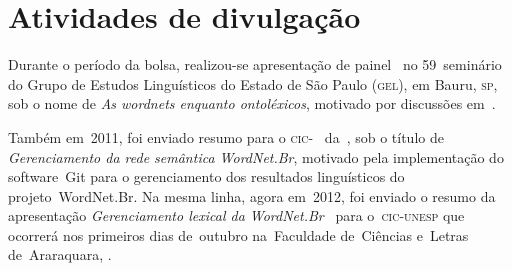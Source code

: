 \chapter{Atividades de divulgação}

Durante o período da bolsa, realizou-se apresentação de
painel~\cite{araujoetal} no 59\textordmasculine~seminário do Grupo de Estudos
Linguísticos do Estado de São Paulo (\textsc{gel}), em Bauru, \textsc{sp}, sob o
nome de \textit{As wordnets enquanto ontoléxicos}, motivado por discussões
em~.

\enlargethispage{\baselineskip}

Também em~2011, foi enviado resumo para o \textsc{cic}-\unesp~\cite{resumocic}
da~\unesp, sob o título de \textit{Gerenciamento da rede semântica WordNet.Br},
motivado pela implementação do software~Git para o gerenciamento dos resultados
linguísticos do projeto~WordNet.Br. Na mesma linha, agora em~2012, foi enviado
o resumo da apresentação \textit{Gerenciamento lexical da
WordNet.Br}~\cite{resumocic2} para o~\textsc{cic-unesp} que ocorrerá nos
primeiros dias de~outubro na~Faculdade de~Ciências e~Letras de~Araraquara,
\unesp.
